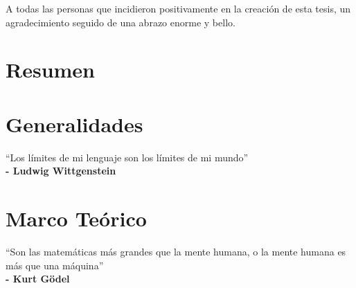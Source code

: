 \documentclass[12pt,oneside,letterpaper]{book}
\begin{document}
A todas las personas que incidieron positivamente en la creación de esta tesis,
un agradecimiento seguido de una abrazo enorme y bello.

\frontmatter 
{}
\chapter*{Resumen}


% 

\pagestyle{fancy}

\setcounter{secnumdepth}{4}
\setcounter{tocdepth}{3}
\renewcommand{\contentsname}{Contenido}
\tableofcontents
\listoffigures
\listoftables
\listofalgorithms{}
\listofmyequations{}
\pagestyle{fancy}

\hypertarget{abbr}{\printnomenclature{}}
\mainmatter{}
\chapter{Generalidades}
\begin{minipage}[t]{0.6\textwidth}
    \begin{flushleft}
        \large
        ``Los límites de mi lenguaje son los límites de mi mundo'' \\
        \textbf{- Ludwig Wittgenstein}
    \end{flushleft}
\end{minipage}


\chapter{Marco Teórico}
\begin{minipage}[t]{0.6\textwidth}
    \begin{flushleft}
        \large
        ``Son las matemáticas más grandes que la mente humana, o la mente humana es más que una máquina'' \\
        \textbf{- Kurt Gödel}
    \end{flushleft}
\end{minipage}


\end{document}
